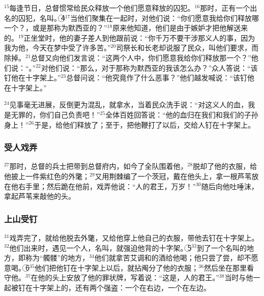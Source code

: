 $^{15}$每逢节日，总督惯常给民众释放一个他们愿意释放的囚犯。$^{16}$那时，正有一个出名的囚犯，名叫\UL[巴辣巴]。\textcircled{4}$^{17}$当他们聚集在一起时，\UL[比拉多]对他们说：“你们愿意我给你们释放哪一个？\UL[巴辣巴]，或是那称为默西亚的\UL[耶稣]？”$^{18}$原来他知道，他们是由于嫉妒才把他解送来的。$^{19}$\UL[比拉多]正坐堂时，他的妻子差人到他跟前说：“你千万不要干涉那义人的事，因为我为他，今天在梦中受了许多苦。”$^{20}$司祭长和长老却说服了民众，叫他们要求\UL[巴辣巴]，而除掉\UL[耶稣]。$^{21}$总督又向他们发言说：“这两个人中，你们愿意我给你们释放那一个？”他们说：“\UL[巴辣巴]。”$^{22}$\UL[比拉多]对他们说：“那么，对于那称为默西亚的\UL[耶稣]我该怎么办？”众人答说：“该钉他在十字架上。”$^{23}$总督问说：“他究竟作了什么恶事？”他们越发喊说：“该钉他在十字架上。”

$^{24}$\UL[比拉多]见事毫无进展，反倒更为混乱，就拿水，当着民众洗手说：“对这义人的血，我是无罪的，你们自己负责吧！”$^{25}$全体百姓回答说：“他的血归在我们和我们的子孙身上！”$^{26}$于是，\UL[比拉多]给他们释放了\UL[巴辣巴]；至于\UL[耶稣]，把他鞭打了以后，交给人钉在十字架上。


\subsubsection{受人戏弄}
$^{27}$那时，总督的兵士把\UL[耶稣]带到总督府内，如今了全队围着他，$^{28}$脱却了他的衣服，给他披上一件紫红色的外氅；$^{29}$又用荆棘编了一个茨冠，戴在他头上，拿一根芦苇放在他右手里；然后跪在他前，戏弄他说：“\UL[犹太]人的君王，万岁！”$^{30}$随后向他吐唾沫，拿起芦苇来敲他的头。


\subsubsection{上山受钉}
$^{31}$戏弄完了，就给他脱去外氅，又给他穿上他自己的衣服，带他去钉在十字架上。$^{32}$他们出来时，遇见一个\UL[基勒乃]人，名叫\UL[西满]，就强迫他背\UL[耶稣]的十字架。\textcircled{5}$^{33}$到了一个名叫\UL[哥耳可达]的地方，即称为“髑髅”的地方，$^{34}$他们就拿苦艾调和的酒给他喝；他只尝了尝，却不愿意喝。\textcircled{6}$^{35}$他们把他钉在十字架上以后，就拈阄分了他的衣服；$^{36}$然后坐在那里看守他。$^{37}$在他的头上安放了他的罪状牌，写着说：“这是\UL[耶稣]，\UL[犹太]人的君王。”$^{38}$当时与他一起被钉在十字架上的，还有两个强盗：一个在右边，一个在左边。


